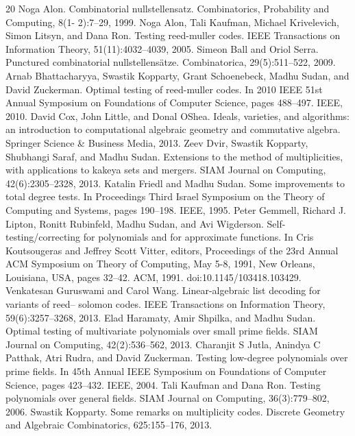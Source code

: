 \documentclass[10pt,a4paper]{article}
\begin{document}
\begin{thebibliography}{20}
 Noga Alon. Combinatorial nullstellensatz. Combinatorics, Probability and Computing, 8(1- 2):7–29, 1999.
 Noga Alon, Tali Kaufman, Michael Krivelevich, Simon Litsyn, and Dana Ron. Testing reed-muller codes. IEEE Transactions on Information Theory, 51(11):4032–4039, 2005.
 Simeon Ball and Oriol Serra. Punctured combinatorial nullstellensätze. Combinatorica, 29(5):511–522, 2009.
 Arnab Bhattacharyya, Swastik Kopparty, Grant Schoenebeck, Madhu Sudan, and David Zuckerman. Optimal testing of reed-muller codes. In 2010 IEEE 51st Annual Symposium on Foundations of Computer Science, pages 488–497. IEEE, 2010.
 David Cox, John Little, and Donal OShea. Ideals, varieties, and algorithms: an introduction to computational algebraic geometry and commutative algebra. Springer Science \& Business Media, 2013.
 Zeev Dvir, Swastik Kopparty, Shubhangi Saraf, and Madhu Sudan. Extensions to the method of multiplicities, with applications to kakeya sets and mergers. SIAM Journal on Computing, 42(6):2305–2328, 2013.
 Katalin Friedl and Madhu Sudan. Some improvements to total degree tests. In Proceedings Third Israel Symposium on the Theory of Computing and Systems, pages 190–198. IEEE, 1995.
 Peter Gemmell, Richard J. Lipton, Ronitt Rubinfeld, Madhu Sudan, and Avi Wigderson. Self-testing/correcting for polynomials and for approximate functions. In Cris Koutsougeras and Jeffrey Scott Vitter, editors, Proceedings of the 23rd Annual ACM Symposium on Theory of Computing, May 5-8, 1991, New Orleans, Louisiana, USA, pages 32–42. ACM, 1991. doi:10.1145/103418.103429.
 Venkatesan Guruswami and Carol Wang. Linear-algebraic list decoding for variants of reed– solomon codes. IEEE Transactions on Information Theory, 59(6):3257–3268, 2013.
 Elad Haramaty, Amir Shpilka, and Madhu Sudan. Optimal testing of multivariate polynomials over small prime fields. SIAM Journal on Computing, 42(2):536–562, 2013.
 Charanjit S Jutla, Anindya C Patthak, Atri Rudra, and David Zuckerman. Testing low-degree polynomials over prime fields. In 45th Annual IEEE Symposium on Foundations of Computer Science, pages 423–432. IEEE, 2004.
 Tali Kaufman and Dana Ron. Testing polynomials over general fields. SIAM Journal on Computing, 36(3):779–802, 2006.
 Swastik Kopparty. Some remarks on multiplicity codes. Discrete Geometry and Algebraic Combinatorics, 625:155–176, 2013.

\end{thebibliography}
\end{document}
